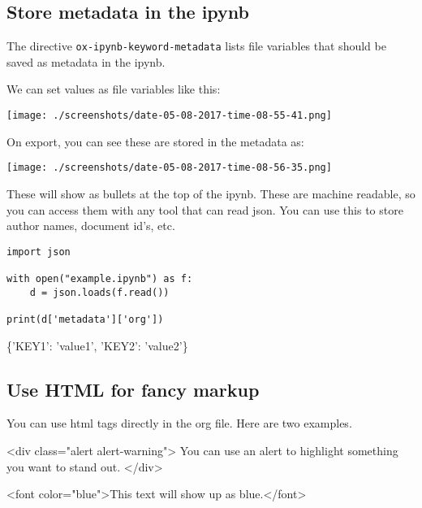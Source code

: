 \documentclass[11pt]{article}
\begin{document}
\subsection{Store metadata in the ipynb}
\label{sec:org002206d}

The directive \texttt{ox-ipynb-keyword-metadata} lists file variables that should be saved as metadata in the ipynb.

We can set values as file variables like this: 


\begin{center}
\texttt{[image: ./screenshots/date-05-08-2017-time-08-55-41.png]}
\end{center}

On export, you can see these are stored in the metadata as:



\begin{center}
\texttt{[image: ./screenshots/date-05-08-2017-time-08-56-35.png]}
\end{center}

These will show as bullets at the top of the ipynb. These are machine readable, so you can access them with any tool that can read json. You can use this to store author names, document id's, etc.

\begin{verbatim}
import json

with open("example.ipynb") as f:
    d = json.loads(f.read())

print(d['metadata']['org'])
\end{verbatim}

\{'KEY1': 'value1', 'KEY2': 'value2'\}

\subsection{Use HTML for fancy markup}
\label{sec:org3784083}

You can use html tags directly in the org file. Here are two examples.

 <div class="alert alert-warning">
You can use an alert to highlight something you want to stand out.
 </div>

<font color="blue">This text will show up as blue.</font>
\end{document}
